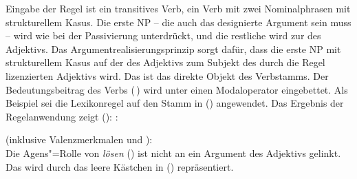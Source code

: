 Eingabe der Regel ist ein transitives Verb, \dash ein Verb mit zwei Nominalphrasen mit strukturellem Kasus.
Die erste NP -- die auch das designierte Argument sein muss  -- wird wie bei der Passivierung unterdrückt, 
und die restliche \argstl {} wird zur \argstl des Adjektivs. Das Argumentrealisierungsprinzip
sorgt dafür, dass die erste NP mit strukturellem Kasus auf der \argstl des Adjektivs zum Subjekt des
durch die Regel lizenzierten Adjektivs wird. Das ist das direkte Objekt des Verbstamms.
Der Bedeutungsbeitrag des Verbs (\ltop {}\,) wird unter einen Modaloperator eingebettet.
Als Beispiel sei die Lexikonregel auf den Stamm  in ()
angewendet. Das Ergebnis der Regelanwendung zeigt ():
\eas
{}:\\
\zs{}

\noindent
\eas
\label{le-lösbar}%
 (inklusive Valenzmerkmalen und \subj):\\
\zs
Die Agens"=Rolle von \emph{lösen} (\argone) ist nicht an ein Argument des
Adjektivs gelinkt. Das wird durch das leere Kästchen in ()
repräsentiert.

